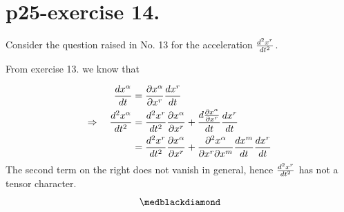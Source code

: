 \section{p25-exercise 14.}
\begin{tcolorbox}
Consider the question raised in No. 13 for the acceleration $\dv[2]{x^r}{t}$.
\end{tcolorbox}
From exercise 13. we know that 

 \begin{align}
 \dv{x^{\alpha}}{t} &= \pdv{x^{\alpha}}{x^r}\dv{x^r}{t}\\ 
 \Rightarrow\quad \dv[2]{x^{\alpha}}{t} &= \dv[2]{x^r}{t}\pdv{x^{\alpha}}{x^r}+ \dv{\pdv{x^{\alpha}}{x^r}}{t}\dv{x^r}{t}\\ 
 &= \dv[2]{x^r}{t}\pdv{x^{\alpha}}{x^r}+ \pdv{x^{\alpha}}{x^r}{x^m}\dv{x^m}{t}\dv{x^r}{t} 
 \end{align}
 The second term on the right does not vanish in general, hence $\dv[2]{x^r}{t}$ has not a tensor character.
$$\medblackdiamond$$
\pagebreak[4]


